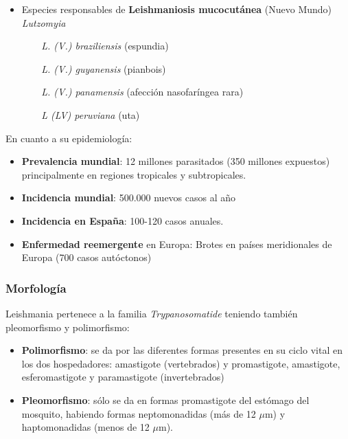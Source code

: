 \begin{itemize}[itemsep=0pt,parsep=0pt,topsep=0pt,partopsep=0pt]
\begin{multicols}{2}
\begin{itemize}[itemsep=0pt,parsep=0pt,topsep=0pt,partopsep=0pt]
			\item[$ $] \textit{L. (L.) venezuelensis}
			\item[$ $] \textit{L. (L.) pifanoi}
		\end{itemize}
	\end{multicols}
	\vspace*{-0.5cm}
	\item Especies responsables de \textbf{Leishmaniosis mucocutánea} (Nuevo Mundo) \textit{Lutzomyia}
	\begin{itemize}[itemsep=0pt,parsep=0pt,topsep=0pt,partopsep=0pt]
		\item[$ $] \textit{L. (V.) braziliensis} (espundia)
		\item[$ $] \textit{L. (V.) guyanensis} (pianbois)
		\item[$ $] \textit{L. (V.) panamensis} (afección nasofaríngea rara)
		\item[$ $] \textit{L (LV) peruviana} (uta)
	\end{itemize}
\end{itemize}

En cuanto a su epidemiología:
\begin{itemize}[itemsep=0pt,parsep=0pt,topsep=0pt,partopsep=0pt] 
	\item \textbf{Prevalencia mundial}: 12 millones parasitados (350 millones expuestos) principalmente en regiones tropicales y subtropicales.
	\item \textbf{Incidencia mundial}: 500.000 nuevos casos al año
	\item \textbf{Incidencia en España}: 100-120 casos anuales.
	\item \textbf{Enfermedad reemergente} en Europa: Brotes en países meridionales de Europa (700 casos autóctonos)
\end{itemize}
\subsubsection{Morfología}
Leishmania pertenece a la familia \textit{Trypanosomatide} teniendo también pleomorfismo y polimorfismo:
\begin{itemize}[itemsep=0pt,parsep=0pt,topsep=0pt,partopsep=0pt] 
	\item \textbf{Polimorfismo}: se da por las diferentes formas presentes en su ciclo vital en los dos hospedadores: amastigote (vertebrados) y promastigote, amastigote, esferomastigote y paramastigote (invertebrados)
	\item \textbf{Pleomorfismo}: sólo se da en formas promastigote del estómago del mosquito, habiendo formas neptomonadidas (más de 12 $\mu$m) y haptomonadidas (menos de 12 $\mu$m).
\end{itemize}

